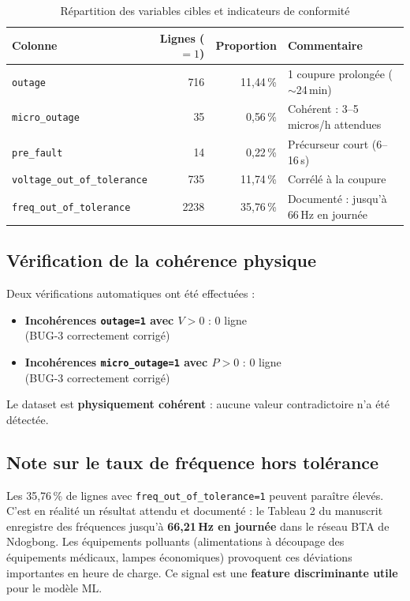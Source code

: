 \documentclass[12pt,a4paper]{article}
\begin{document}
\begin{table}[h]
\centering
\begin{tabular}{@{}lrrl@{}}
\toprule
Colonne & Lignes ($=1$) & Proportion & Commentaire \\
\midrule
\texttt{outage}      & 716  & 11{,}44\,\% & 1 coupure prolongée ($\sim$24\,min) \\
\texttt{micro\_outage} & 35   & 0{,}56\,\%  & Cohérent : 3–5 micros/h attendues \\
\texttt{pre\_fault}  & 14   & 0{,}22\,\%  & Précurseur court (6–16\,s) \\
\midrule
\texttt{voltage\_out\_of\_tolerance} & 735 & 11{,}74\,\% & Corrélé à la coupure \\
\texttt{freq\_out\_of\_tolerance}    & 2238 & 35{,}76\,\% & Documenté : jusqu'à 66\,Hz en journée~\cite{moukengue} \\
\bottomrule
\end{tabular}
\caption{Répartition des variables cibles et indicateurs de conformité}
\end{table}

\subsection{Vérification de la cohérence physique}

Deux vérifications automatiques ont été effectuées :

\begin{itemize}
  \item \textbf{Incohérences \texttt{outage=1} avec $V > 0$} : \textcolor{okgreen}{0 ligne} \\
        (BUG-3 correctement corrigé)
  \item \textbf{Incohérences \texttt{micro\_outage=1} avec $P > 0$} : \textcolor{okgreen}{0 ligne} \\
        (BUG-3 correctement corrigé)
\end{itemize}

Le dataset est \textbf{physiquement cohérent} : aucune valeur contradictoire n'a été
détectée.

\subsection{Note sur le taux de fréquence hors tolérance}

Les 35{,}76\,\% de lignes avec \texttt{freq\_out\_of\_tolerance=1} peuvent paraître
élevés. C'est en réalité un résultat attendu et documenté : le Tableau 2 du manuscrit
enregistre des fréquences jusqu'à \textbf{66{,}21\,Hz en journée} dans le réseau BTA
de Ndogbong. Les équipements polluants (alimentations à découpage des équipements
médicaux, lampes économiques) provoquent ces déviations importantes en heure de charge.
Ce signal est une \textbf{feature discriminante utile} pour le modèle ML.
\end{document}
